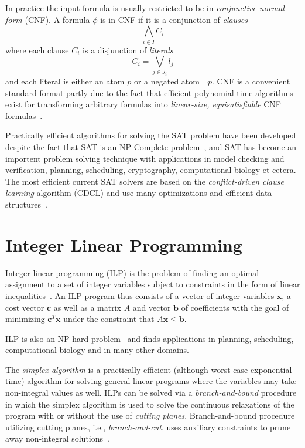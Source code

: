 \documentclass[12pt,a4paper]{article}
\begin{document}
In practice the input formula is usually restricted to be in \emph{conjunctive normal form} (CNF).
A formula $\phi$ is in CNF if it is a conjunction of \emph{clauses}
$$ \bigwedge_{i\in I} C_i $$
where each clause $C_i$ is a disjunction of \emph{literals}
$$ C_i = \bigvee_{j\in J_i} l_j $$
and each literal is either an atom $p$ or a negated atom $\neg p$.
CNF is a convenient standard format partly due to the fact that efficient polynomial-time algorithms exist for transforming arbitrary formulas into \emph{linear-size, equisatisfiable} CNF formulas~\cite{tseitin1983, DBLP:journals/jsc/PlaistedG86}.

Practically efficient algorithms for solving the SAT problem have been developed despite the fact that SAT is an NP-Complete problem~\cite{DBLP:conf/stoc/Cook71}, 
and SAT has become an importent problem solving technique with applications in model checking and verification, planning, scheduling, cryptography, computational biology et cetera.
The most efficient current SAT solvers are based on the \emph{conflict-driven clause learning} algorithm (CDCL) and use many optimizations and efficient data structures~\cite{DBLP:conf/iccad/SilvaS96, DBLP:journals/tc/Marques-SilvaS99, DBLP:conf/dac/MoskewiczMZZM01, DBLP:conf/aaai/GomesSK98, DBLP:journals/dam/GoldbergN07, ryan2004efficient, DBLP:conf/aaai/BayardoS97, DBLP:conf/sat/LewisSB05}.


\section{Integer Linear Programming}
\label{sec:ilp}
Integer linear programming (ILP) is the problem of finding an optimal assignment to a set of integer variables subject to constraints in the form of linear inequalities~\cite{DBLP:books/ph/PapadimitriouS82}.
An ILP program thus consists of a vector of integer variables $\mathbf{x}$, a cost vector $\mathbf{c}$ as well as a matrix $A$ and vector $\mathbf{b}$ of coefficients with the goal of minimizing $\mathbf{c}^T \mathbf{x}$ under the constraint that $A\mathbf{x} \leq \mathbf{b}$.

ILP is also an NP-hard problem~\cite{DBLP:conf/coco/Karp72} and finds applications in planning, scheduling, computational biology and in many other domains.

The \emph{simplex algorithm} is a practically efficient (although worst-case exponential time) algorithm for solving general linear programs where the variables may take non-integral values as well.
ILPs can be solved via a \emph{branch-and-bound} procedure in which the simplex algorithm is used to solve the continuous relaxations of the program with or without the use of \emph{cutting planes}.
Branch-and-bound procedure utilizing cutting planes, i.e., \emph{branch-and-cut}, uses auxiliary constraints to prune away non-integral solutions~\cite{DBLP:books/ph/PapadimitriouS82}.
\end{document}
